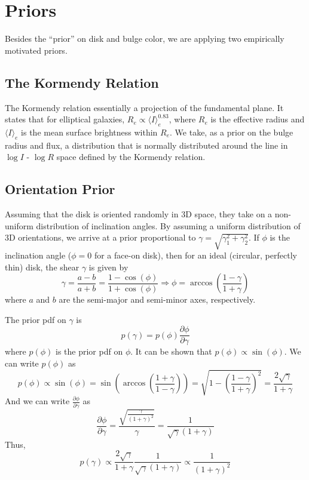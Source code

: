 \documentclass{article}
\begin{document}
\section{Priors}
Besides the ``prior'' on disk and bulge color, we are applying two
empirically motivated priors.
\subsection{The Kormendy Relation}
The Kormendy relation essentially a projection of the fundamental
plane.  It states that for elliptical galaxies,
$R_e \propto \langle I \rangle_e^{0.83}$, where $R_e$ is the effective radius
and $\langle I \rangle_e$ is the mean surface brightness within $R_e$.
We take, as a prior on the bulge radius and flux, a
distribution that is normally distributed around the line in $\log I$
- $\log R$ space defined by the Kormendy relation.

\subsection{Orientation Prior}
Assuming that the disk is oriented randomly in 3D space,
they take on a non-uniform distribution of inclination angles.  By
assuming a uniform distribution of 3D orientations, we arrive at a
 prior proportional to $\gamma = \sqrt{\gamma_1^2 + \gamma_2^2}$.
If $\phi$ is the inclination angle ($\phi = 0$ for a face-on disk), then for an ideal
(circular, perfectly thin) disk, the shear $\gamma$ is given by
\[
\gamma = \frac{a - b}{a + b} = \frac{1 - \cos(\phi)}{1 + \cos(\phi)}
\Rightarrow \phi = \arccos{\left( \frac{1 - \gamma}{1 + \gamma} \right) }
\]
where $a$ and $b$ are the semi-major and semi-minor axes, respectively.

The prior pdf on $\gamma$ is
\[
p(\gamma) = p(\phi) \frac{\partial \phi}{\partial \gamma}
\]
where $p(\phi)$ is the prior pdf on $\phi$. It can be shown that
$p(\phi) \propto \sin (\phi)$.  We can write $p(\phi)$ as
\[
p(\phi) \propto \sin(\phi)
= \sin \left( \arccos \left( \frac{1 + \gamma}{1 - \gamma} \right) \right)
= \sqrt{1 - \left( \frac{1 - \gamma}{1 + \gamma} \right)^2}
= \frac{2 \sqrt{\gamma}}{1 + \gamma}
\]
And we can write $\frac{\partial \phi}{\partial \gamma}$ as
\[
\frac{\partial \phi}{\partial \gamma}
= \frac{\sqrt{\frac{\gamma}{(1 + \gamma)^2}}}{\gamma}
= \frac{1}{\sqrt{\gamma} (1 + \gamma)}
\]
Thus,
\[
p(\gamma) \propto \frac{2 \sqrt{\gamma}}{1 + \gamma} \frac{1}{\sqrt{\gamma} (1 + \gamma)}
\propto \frac{1}{(1 + \gamma)^2}
\]
\end{document}
